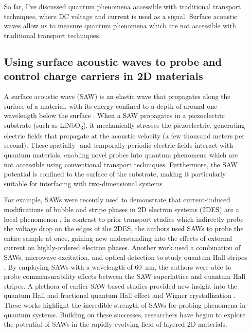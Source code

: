 \documentclass[double,12pt,1in,seploa]{beavtex}
\let\Oldsubsection\subsection
\renewcommand{\subsection}{\FloatBarrier\Oldsubsection}
\begin{document}
So far, I've discussed quantum phenomena accessible with traditional transport techniques, where DC voltage and current is used as a signal. Surface acoustic waves allow us to measure quantum phenomena which are not accessible with traditional transport techniques.

\subsection{Using surface acoustic waves to probe and control charge carriers in 2D materials} \label{using surface acoustic waves to probe and control quantum phenomena}


A surface acoustic wave (SAW) is an elastic wave that propagates along the surface of a
material, with its energy confined to a depth of around one wavelength below the surface \cite{rayleigh_waves_1885}. When a SAW propagates in a piezoelectric substrate (such as LiNbO\textsubscript{3}), it mechanically stresses the piezoelectric, generating electric fields that propagate at the acoustic velocity (a few thousand meters per second). These spatially- and temporally-periodic electric fields interact with quantum materials, enabling novel probes into quantum phenomena which are not accessible using conventional transport techniques. Furthermore, the SAW potential is confined to the surface of the substrate, making it particularly suitable for interfacing with two-dimensional systems

For example, SAWs were recently used to demonstrate that current-induced modifications of bubble and stripe phases in 2D electron systems (2DES) are a local phenomenon \cite{friess_current_2018}. In contrast to prior transport studies which indirectly probe the voltage drop on the edges of the 2DES, the authors used SAWs to probe the entire sample at once, gaining new understanding into the effects of external current on highly-ordered electron phases. Another work used a combination of SAWs, microwave excitation, and optical detection to study quantum Hall stripes \cite{kukushkin_collective_2011}. By employing SAWs with a wavelength of \SI{60}{\nano\meter}, the authors were able to probe commensurability effects between the SAW superlattice and quantum Hall stripes. A plethora of earlier SAW-based studies provided new insight into the quantum Hall and fractional quantum Hall effect \cite{wixforth_quantum_1986,esslinger_acoustoelectric_1992,esslinger_ultrasonic_1994,kukushkin_collective_2011,willett_experimental_1993} and Wigner crystallization \cite{paalanen_rf_1992}. These works highlight the incredible strength of SAWs for probing phenomena in quantum systems. Building on these successes, researchers have begun to explore the potential of SAWs in the rapidly evolving field of layered 2D materials.
\end{document}
